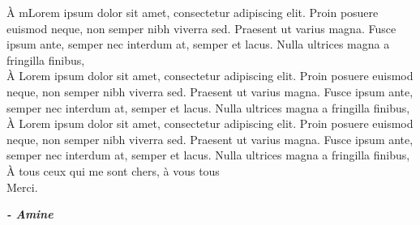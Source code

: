 
\begin{fquote}
    \begin{center}
        \large{

            \uppercase{à} mLorem ipsum dolor sit amet, consectetur adipiscing elit. Proin posuere euismod neque, non semper nibh viverra sed. Praesent ut varius magna. Fusce ipsum ante, semper nec interdum at, semper et lacus. Nulla ultrices magna a fringilla finibus,\\[12pt]
            \uppercase{à} Lorem ipsum dolor sit amet, consectetur adipiscing elit. Proin posuere euismod neque, non semper nibh viverra sed. Praesent ut varius magna. Fusce ipsum ante, semper nec interdum at, semper et lacus. Nulla ultrices magna a fringilla finibus,\\[12pt]
            \uppercase{à} Lorem ipsum dolor sit amet, consectetur adipiscing elit. Proin posuere euismod neque, non semper nibh viverra sed. Praesent ut varius magna. Fusce ipsum ante, semper nec interdum at, semper et lacus. Nulla ultrices magna a fringilla finibus,\\[12pt]
            \uppercase{à} tous ceux qui me sont chers, à vous tous\\[12pt]
            Merci.
        }
    \end{center}
    \bigskip
    \medskip
\end{fquote}

\begin{adjustwidth}{2cm}{1cm}
    \hspace*{\fill} \textbf{\textit{\large{- Amine}}}
\end{adjustwidth}

\clearpage
